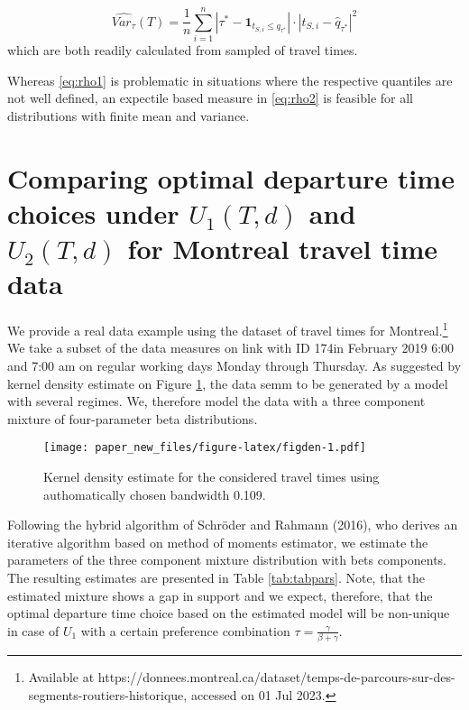 \documentclass[
]{article}
\theoremstyle{definition}
\theoremstyle{definition}
\theoremstyle{definition}
\theoremstyle{definition}
\theoremstyle{remark}
\begin{document}
\[\widehat{Var_\tau} (T) = \frac 1n\sum_{i=1}^n |\tau^*- \mathbf 1_{t_{S,i}\leq q_{\tau^*}}|\cdot |t_{S,i}-\hat q_{\tau^*}|^2\]
which are both readily calculated from sampled of travel times.

Whereas \eqref{eq:rho1} is problematic in situations where the respective quantiles are not well defined, an expectile based measure in \eqref{eq:rho2} is feasible for all distributions with finite mean and variance.

\hypertarget{comparing-optimal-departure-time-choices-under-u_1td-and-u_2td-for-montreal-travel-time-data}{%
\section{\texorpdfstring{Comparing optimal departure time choices under \(U_1(T,d)\) and \(U_2(T,d)\) for Montreal travel time data}{Comparing optimal departure time choices under U\_1(T,d) and U\_2(T,d) for Montreal travel time data}}\label{comparing-optimal-departure-time-choices-under-u_1td-and-u_2td-for-montreal-travel-time-data}}

We provide a real data example using the dataset of travel times for Montreal.\footnote{ Available at
https://donnees.montreal.ca/dataset/temps-de-parcours-sur-des-segments-routiers-historique, accessed on 01 Jul 2023.} We take a subset of the data measures on link with ID 174in February 2019 6:00 and 7:00 am on regular working days Monday through Thursday. As suggested by kernel density estimate on Figure \ref{fig:figden}, the data semm to be generated by a model with several regimes. We, therefore model the data with a three component mixture of four-parameter beta distributions.

\begin{figure}
\centering
\texttt{[image: paper\_new\_files/figure-latex/figden-1.pdf]}
\caption{\label{fig:figden}Kernel density estimate for the considered travel times using authomatically chosen bandwidth 0.109.}
\end{figure}

Following the hybrid algorithm of Schröder and Rahmann (2016), who derives an iterative algorithm based on method of moments estimator, we estimate the parameters of the three component mixture distribution with bets components. The resulting estimates are presented in Table \ref{tab:tabpars}. Note, that the estimated mixture shows a gap in support and we expect, therefore, that the optimal departure time choice based on the estimated model will be non-unique in case of \(U_1\) with a certain preference combination \(\tau = \frac{\gamma}{\beta+\gamma}\).
\end{document}
